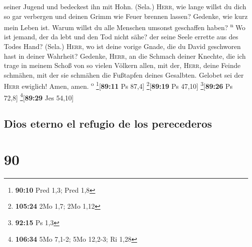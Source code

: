 seiner Jugend und bedeckest ihn mit Hohn. (Sela.) 
\textsc{Herr}, wie lange willst du dich so gar verbergen und deinen
Grimm wie Feuer brennen lassen?  Gedenke, wie kurz mein
Leben ist. Warum willst du alle Menschen umsonst geschaffen haben?
\textsuperscript{n}  Wo ist jemand, der da lebt und den
Tod nicht sähe? der seine Seele errette aus des Todes Hand? (Sela.)
 \textsc{Herr}, wo ist deine vorige Gnade, die du David
geschworen hast in deiner Wahrheit?  Gedenke,
\textsc{Herr}, an die Schmach deiner Knechte, die ich trage in meinem
Schoß von so vielen Völkern allen,  mit der,
\textsc{Herr}, deine Feinde schmähen, mit der sie schmähen die Fußtapfen
deines Gesalbten.  Gelobet sei der \textsc{Herr}
ewiglich! Amen, amen. \textsuperscript{o} \footnote{\textbf{90:10} Pred
  1,3; Pred 1,8}{[}\textbf{89:11} Ps 87,4{]}
\footnote{\textbf{105:24} 2Mo 1,7; 2Mo 1,12}{[}\textbf{89:19} Ps
47,10{]} \footnote{\textbf{92:15} Ps 1,3}{[}\textbf{89:26} Ps 72,8{]}
\footnote{\textbf{106:34} 5Mo 7,1-2; 5Mo 12,2-3; Ri 1,28}{[}\textbf{89:29}
Jes 54,10{]}

\hypertarget{dios-eterno-el-refugio-de-los-perecederos}{%
\subsection{Dios eterno el refugio de los
perecederos}\label{dios-eterno-el-refugio-de-los-perecederos}}

\hypertarget{section-89}{%
\section{90}\label{section-89}}

